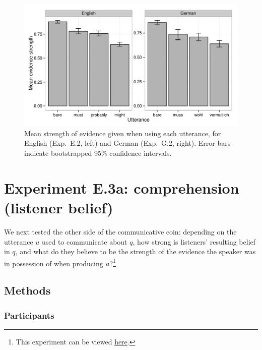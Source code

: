 \documentclass[11pt]{article}
\begin{document}
\begin{figure}
\centering
\includegraphics[width=.9\textwidth]{pics/mean-production-evidence}
\caption{Mean strength of evidence given when using each utterance, for English (Exp.~E.2, left) and German (Exp.~G.2, right). Error bars indicate bootstrapped 95\% confidence intervals.}
\label{fig:utterances-estrength}
\end{figure}

\section{Experiment E.3a: comprehension (listener belief)}


We next tested the other side of the communicative coin: depending on the utterance $u$ used to communicate about $q$, how strong is listeners' resulting belief in $q$, and what do they believe to be the strength of the evidence the speaker was in possession of when producing $u$?\footnote{This experiment can be viewed \href{http://stanford.edu/~jdegen/72_modals_comprehension_evidence_room/modals.html}{here}.}

\subsection{Methods}

\subsubsection{Participants}
\end{document}
